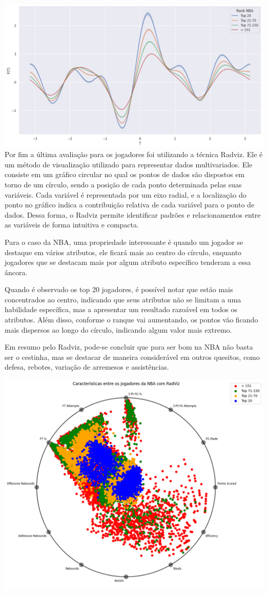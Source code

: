 \documentclass[
]{book}
\begin{document}
\includegraphics{imagens/7.png} Por fim a última avaliação para os jogadores foi utilizando a técnica Radviz. Ele é um método de visualização utilizado para representar dados multivariados. Ele consiste em um gráfico circular no qual os pontos de dados são dispostos em torno de um círculo, sendo a posição de cada ponto determinada pelas suas variáveis. Cada variável é representada por um eixo radial, e a localização do ponto no gráfico indica a contribuição relativa de cada variável para o ponto de dados. Dessa forma, o Radviz permite identificar padrões e relacionamentos entre as variáveis de forma intuitiva e compacta.

Para o caso da NBA, uma propriedade interessante é quando um jogador se destaque em vários atributos, ele ficará mais ao centro do círculo, enquanto jogadores que se destacam mais por algum atributo específico tenderam a essa âncora.

Quando é observado os top 20 jogadores, é possível notar que estão mais concentrados ao centro, indicando que seus atributos não se limitam a uma habilidade específica, mas a apresentar um resultado razoável em todos os atributos. Além disso, conforme o ranque vai aumentando, os pontos vão ficando mais dispersos ao longo do círculo, indicando algum valor mais extremo.

Em resumo pelo Radviz, pode-se concluir que para ser bom na NBA não basta ser o cestinha, mas se destacar de maneira considerável em outros quesitos, como defesa, rebotes, variação de arremesos e assistências.

\includegraphics{imagens/download.png}
\end{document}
